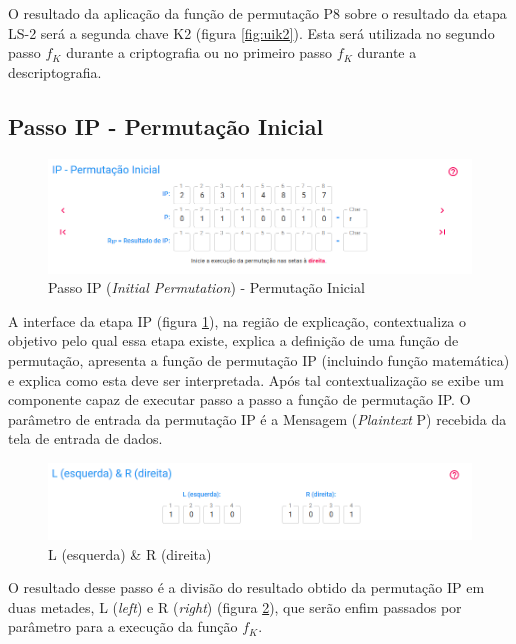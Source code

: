O resultado da aplicação da função de permutação P8 sobre o resultado da etapa LS-2 será a segunda chave K2 (figura \ref{fig:uik2}). Esta será utilizada no segundo passo \(f_K\) durante a criptografia ou no primeiro passo \(f_K\) durante a descriptografia.

\subsection{Passo IP - Permutação Inicial}

\begin{figure}[H]
    \centering
    \caption{Passo IP (\textit{Initial Permutation}) - Permutação Inicial}
    \label{fig:uiip}
    \includegraphics[width=1\linewidth]{UI/UIIP.png}
\end{figure}

A interface da etapa IP (figura \ref{fig:uiip}), na região de explicação, contextualiza o objetivo pelo qual essa etapa existe, explica a definição de uma função de permutação, apresenta a função de permutação IP (incluindo função matemática) e explica como esta deve ser interpretada. Após tal contextualização se exibe um componente capaz de executar passo a passo a função de permutação IP. O parâmetro de entrada da permutação IP é a Mensagem (\textit{Plaintext} P) recebida da tela de entrada de dados.

\begin{figure}[H]
    \centering
    \caption{L (esquerda) \& R (direita)}
    \label{fig:uilr}
    \includegraphics[width=1\linewidth]{UI/UILR.png}
\end{figure}

O resultado desse passo é a divisão do resultado obtido da permutação IP em duas metades, L (\textit{left}) e R (\textit{right}) (figura \ref{fig:uilr}), que serão enfim passados por parâmetro para a execução da função \(f_K\).

